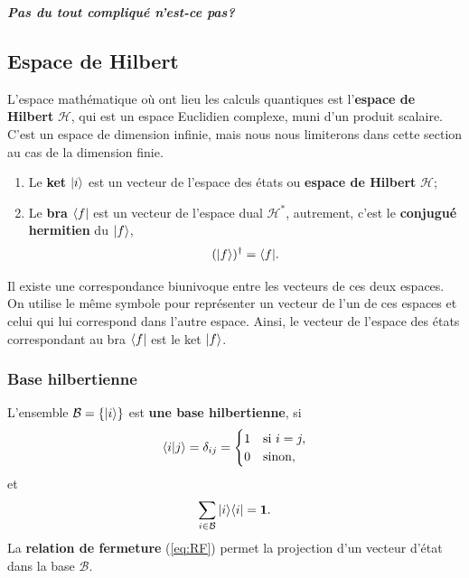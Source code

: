 \begin{footnotesize}
\begin{solution}
\begin{enumerate}
\end{enumerate}

\textbf{\emph{Pas du tout compliqué n'est-ce pas?}}
\end{solution}
\end{footnotesize}

\subsection{Espace de Hilbert}
\label{sec:EH}

L'espace mathématique où ont lieu les calculs quantiques est l'\textbf{espace de
Hilbert} $\mathcal{H}$, qui est un espace Euclidien complexe, muni d'un produit
scalaire. C'est un espace de dimension infinie, mais nous nous limiterons dans
cette section au cas de la dimension finie.
\begin{enumerate}
\item Le \textbf{ket} $\vert i\rangle$ est un vecteur de l'espace des états ou
\textbf{espace de Hilbert }$\mathcal{H}$;

\item Le \textbf{bra} $\langle f\vert$ est un vecteur de l'espace dual
$\mathcal{H}^{\ast}$, autrement, c'est le \textbf{conjugué hermitien} du
$\vert f\rangle$,
\begin{equation}
 (\vert f\rangle)^{\dag}=\langle f\vert.
\end{equation}
\end{enumerate}

Il existe une correspondance biunivoque entre les vecteurs de ces deux
espaces. On utilise le même symbole pour représenter un vecteur de l'un de ces
espaces et celui qui lui correspond dans l'autre espace. Ainsi, le vecteur de
l'espace des états correspondant au bra $\langle f\vert$ est le ket $\vert f\rangle$.

\subsubsection{Base hilbertienne}

\medskip\colorbox[gray]{0.8}{
\parbox[c]{0.9\textwidth}{
\begin{definition}
L'ensemble $\mathcal{B}=\{\vert i\rangle\}$ est \textbf{une base hilbertienne}, si
\begin{equation}
\langle i\vert j\rangle =\delta_{ij}=\begin{cases}
1 & \text{si }i=j,\\
0 & \text{sinon,}
\end{cases}
\label{eq:dij}
\end{equation}
et
\begin{equation}
\sum_{i\in\mathcal{B}}\vert i\rangle\langle i\vert=\mathbf{1}.
\label{eq:RF}
\end{equation}
La \textbf{relation de fermeture} (\ref{eq:RF}) permet la projection d'un
vecteur d'état dans la base $\mathcal{B}$.
\end{definition}
}}

